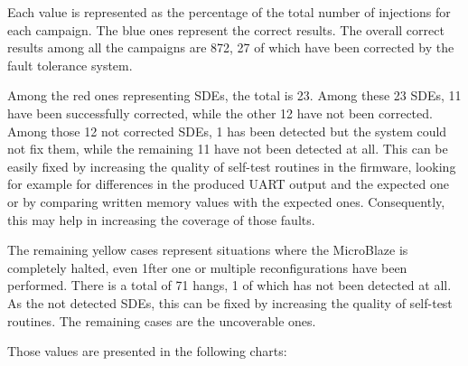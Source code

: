 Each value is represented as the percentage of the total number of injections for each campaign. The blue ones represent the correct results. The overall correct results among all the campaigns are 872, 27 of which have been corrected by the fault tolerance system. \bigskip

Among the red ones representing SDEs, the total is 23. Among these 23 SDEs, 11 have been successfully corrected, while the other 12 have not been corrected. Among those 12 not corrected SDEs, 1 has been detected but the system could not fix them, while the remaining 11 have not been detected at all. This can be easily fixed by increasing the quality of self-test routines in the firmware, looking for example for differences in the produced UART output and the expected one or by comparing written memory values with the expected ones. Consequently, this may help in increasing the coverage of those faults. \bigskip

The remaining yellow cases represent situations where the MicroBlaze is completely halted, even 1fter one or multiple reconfigurations have been performed. There is a total of 71 hangs, 1 of which has not been detected at all. As the not detected SDEs, this can be fixed by increasing the quality of self-test routines. The remaining cases are the uncoverable ones. \bigskip

Those values are presented in the following charts:

